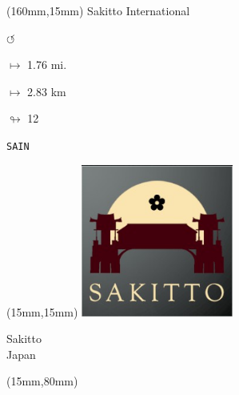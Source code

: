 \begin{textblock*}{40mm}(160mm,15mm)%
Sakitto International
\par \Huge$\circlearrowleft$
\Large
\par$\mapsto$ 1.76 mi.
\par$\mapsto$ 2.83 km
\par$\looparrowright$ 12
\par\hfill\tiny\tt SAIN\\
\end{textblock*}
\null\newpage

\begin{textblock*}{50mm}(15mm,15mm)%
\includegraphics[width=50mm]{LG/2015-05-20_00093.png}
\par Sakitto\\ Japan
\end{textblock*}
\begin{textblock*}{185mm}(15mm,80mm)%
\end{textblock*}
